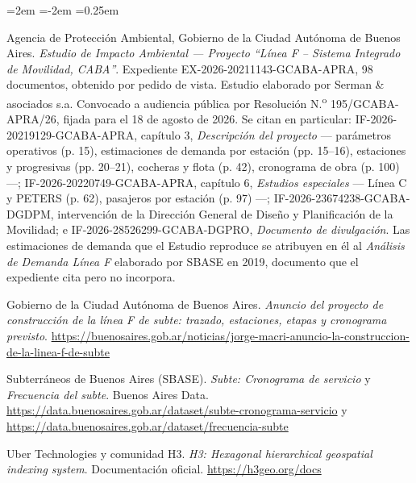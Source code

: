 \documentclass{article}
\begin{document}
\begin{list}{}{\leftmargin=2em \itemindent=-2em \itemsep=0.25em}
\item[] [13] Agencia de Protección Ambiental, Gobierno de la Ciudad Autónoma de Buenos Aires.
  \textit{Estudio de Impacto Ambiental --- Proyecto ``Línea F -- Sistema Integrado de Movilidad, CABA''}.
  Expediente EX-2026-20211143-GCABA-APRA, 98 documentos, obtenido por pedido de vista. Estudio elaborado por
  Serman \& asociados s.a. Convocado a audiencia pública por Resolución N.\textsuperscript{o}
  195/GCABA-APRA/26, fijada para el 18 de agosto de 2026. Se citan en particular: IF-2026-20219129-GCABA-APRA,
  capítulo 3, \textit{Descripción del proyecto} --- parámetros operativos (p. 15), estimaciones de demanda por
  estación (pp. 15--16), estaciones y progresivas (pp. 20--21), cocheras y flota (p. 42), cronograma de obra
  (p. 100) ---; IF-2026-20220749-GCABA-APRA, capítulo 6, \textit{Estudios especiales} --- Línea C y PETERS
  (p. 62), pasajeros por estación (p. 97) ---; IF-2026-23674238-GCABA-DGDPM, intervención de la Dirección
  General de Diseño y Planificación de la Movilidad; e IF-2026-28526299-GCABA-DGPRO, \textit{Documento de
  divulgación}. Las estimaciones de demanda que el Estudio reproduce se atribuyen en él al
  \textit{Análisis de Demanda Línea F} elaborado por SBASE en 2019, documento que el expediente cita pero no
  incorpora.

\item[] [14] Gobierno de la Ciudad Autónoma de Buenos Aires. \textit{Anuncio del proyecto de construcción de
  la línea F de subte: trazado, estaciones, etapas y cronograma previsto}.
  \url{https://buenosaires.gob.ar/noticias/jorge-macri-anuncio-la-construccion-de-la-linea-f-de-subte}

\item[] [15] Subterráneos de Buenos Aires (SBASE). \textit{Subte: Cronograma de servicio} y
  \textit{Frecuencia del subte}. Buenos Aires Data.
  \url{https://data.buenosaires.gob.ar/dataset/subte-cronograma-servicio} y
  \url{https://data.buenosaires.gob.ar/dataset/frecuencia-subte}

\item[] [16] Uber Technologies y comunidad H3. \textit{H3: Hexagonal hierarchical geospatial indexing
  system}. Documentación oficial. \url{https://h3geo.org/docs}

\end{list}
\end{document}
